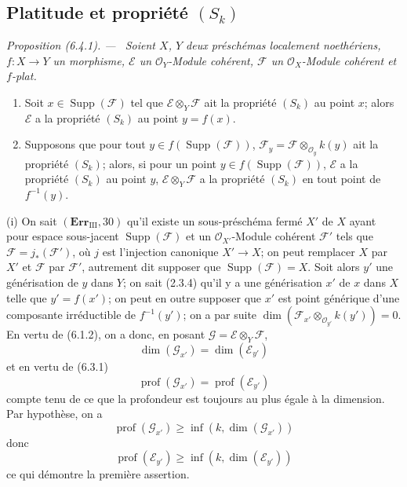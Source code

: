 \documentclass[10pt,oneside]{book}
\newenvironment{proposition}[1][]{%
  \par\medskip\noindent\itshape Proposition (#1). ---\ }{\par}
\begin{document}
\subsection{\texorpdfstring{Platitude et propriété $(S_k)$}{Platitude et propriété (S\string_k)}}

\begin{proposition}[6.4.1]
\label{IV.2.s6.4.1-fr}
Soient $X$, $Y$ deux préschémas localement noethériens, $f:X\to Y$ un
morphisme, $\mathscr E$ un $\mathcal O_Y$-Module cohérent,
$\mathscr F$ un $\mathcal O_X$-Module cohérent et $f$-plat.
\begin{enumerate}
\item[(i)] Soit $x\in\operatorname{Supp}(\mathscr F)$ tel que
$\mathscr E\otimes_Y\mathscr F$ ait la propriété $(S_k)$ au point $x$; alors
$\mathscr E$ a la propriété $(S_k)$ au point $y=f(x)$.
\item[(ii)] Supposons que pour tout
$y\in f(\operatorname{Supp}(\mathscr F))$,
$\mathscr F_y=\mathscr F\otimes_{\mathcal O_y}k(y)$ ait la propriété
$(S_k)$; alors, si pour un point
$y\in f(\operatorname{Supp}(\mathscr F))$, $\mathscr E$ a la propriété
$(S_k)$ au point $y$, $\mathscr E\otimes_Y\mathscr F$ a la propriété
$(S_k)$ en tout point de $f^{-1}(y)$.
\end{enumerate}
\end{proposition}

(i) On sait $(\mathbf{Err}_{\mathrm{III}},30)$ qu'il existe un sous-préschéma
fermé $X'$ de $X$ ayant pour espace sous-jacent
$\operatorname{Supp}(\mathscr F)$ et un $\mathcal O_{X'}$-Module cohérent
$\mathscr F'$ tels que $\mathscr F=j_*(\mathscr F')$, où $j$ est l'injection
canonique $X'\to X$; on peut remplacer $X$ par $X'$ et $\mathscr F$ par
$\mathscr F'$, autrement dit supposer que
$\operatorname{Supp}(\mathscr F)=X$. Soit alors $y'$ une générisation de $y$
dans $Y$; on sait (2.3.4) qu'il y a une générisation $x'$ de $x$ dans $X$
telle que $y'=f(x')$; on peut en outre supposer que $x'$ est point générique
d'une composante irréductible de $f^{-1}(y')$; on a par suite
$\dim(\mathscr F_{x'}\otimes_{\mathcal O_{y'}}k(y'))=0$. En vertu de (6.1.2),
on a donc, en posant $\mathscr G=\mathscr E\otimes_Y\mathscr F$,
\[
\dim(\mathscr G_{x'})=\dim(\mathscr E_{y'})
\]
et en vertu de (6.3.1)
\[
\operatorname{prof}(\mathscr G_{x'})=\operatorname{prof}(\mathscr E_{y'})
\]
compte tenu de ce que la profondeur est toujours au plus égale à la
dimension. Par hypothèse, on a
\[
\operatorname{prof}(\mathscr G_{x'})
\geq\inf(k,\dim(\mathscr G_{x'}))
\]
donc
\[
\operatorname{prof}(\mathscr E_{y'})
\geq\inf(k,\dim(\mathscr E_{y'}))
\]
ce qui démontre la première assertion.
\end{document}
